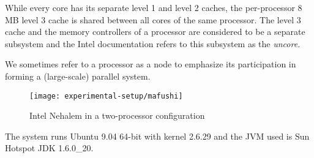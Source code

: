 While every core has its separate level 1 and level 2 caches, the
per-processor 8 MB level 3 cache is shared between all cores of the
same processor. The level 3 cache and the memory controllers of a
processor are considered to be a separate subsystem and the Intel
documentation refers to this subsystem as the \emph{uncore}.

We sometimes refer to a processor as a node to emphasize its
participation in forming a (large-scale) parallel system.

\begin{figure}[htb]
  \centering
  \texttt{[image: experimental-setup/mafushi]}
  \caption[Intel Nehalem in a two-processor configuration]{Intel
    Nehalem in a two-processor configuration}
  \label{fig:experimental-setup-mafushi}
\end{figure}

The system runs Ubuntu 9.04 64-bit with kernel 2.6.29 and the JVM used
is Sun Hotspot JDK 1.6.0\_20.


